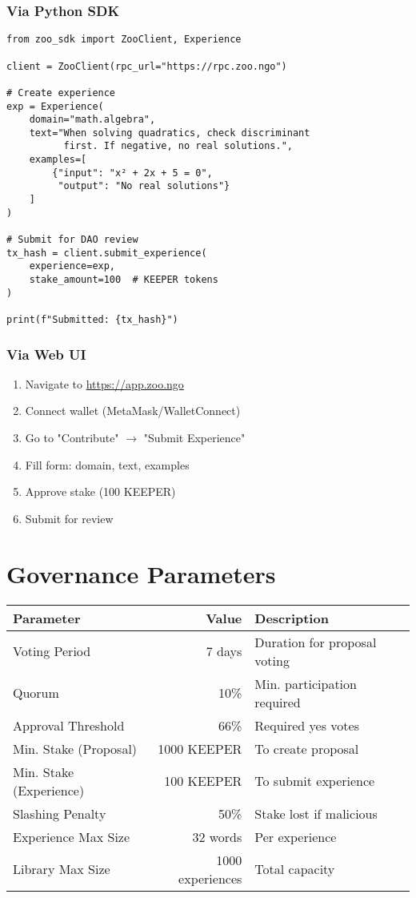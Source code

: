 \documentclass[11pt,a4paper]{article}
\begin{document}
\subsubsection{Via Python SDK}
\begin{verbatim}
from zoo_sdk import ZooClient, Experience

client = ZooClient(rpc_url="https://rpc.zoo.ngo")

# Create experience
exp = Experience(
    domain="math.algebra",
    text="When solving quadratics, check discriminant
          first. If negative, no real solutions.",
    examples=[
        {"input": "x² + 2x + 5 = 0",
         "output": "No real solutions"}
    ]
)

# Submit for DAO review
tx_hash = client.submit_experience(
    experience=exp,
    stake_amount=100  # KEEPER tokens
)

print(f"Submitted: {tx_hash}")
\end{verbatim}

\subsubsection{Via Web UI}
\begin{enumerate}
\item Navigate to \url{https://app.zoo.ngo}
\item Connect wallet (MetaMask/WalletConnect)
\item Go to "Contribute" $\rightarrow$ "Submit Experience"
\item Fill form: domain, text, examples
\item Approve stake (100 KEEPER)
\item Submit for review
\end{enumerate}

\section{Governance Parameters}

\begin{center}
\begin{tabular}{lrl}
\toprule
\textbf{Parameter} & \textbf{Value} & \textbf{Description} \\
\midrule
Voting Period & 7 days & Duration for proposal voting \\
Quorum & 10\% & Min. participation required \\
Approval Threshold & 66\% & Required yes votes \\
Min. Stake (Proposal) & 1000 KEEPER & To create proposal \\
Min. Stake (Experience) & 100 KEEPER & To submit experience \\
Slashing Penalty & 50\% & Stake lost if malicious \\
Experience Max Size & 32 words & Per experience \\
Library Max Size & 1000 experiences & Total capacity \\
\bottomrule
\end{tabular}
\end{center}
\end{document}
